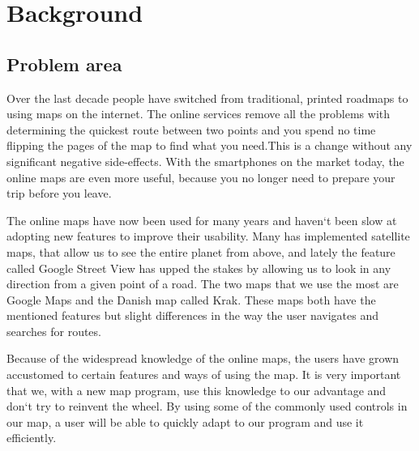 \chapter{Background}
\label{BG}
\section{Problem area}
\label{BG-PR}
Over the last decade people have switched from traditional, printed roadmaps 
to using maps on the internet. The online services remove all the problems with
determining the quickest route between two points and you spend no time flipping
the pages of the map to find what you need.This is a change without any
significant negative side-effects. With the smartphones on the market today, the
online maps are even more useful, because you no longer need to prepare your
trip before you leave.

The online maps have now been used for many years and haven`t been slow 
at adopting new features to improve their usability. Many has 
implemented satellite maps, that allow us to see the entire planet 
from above, and lately the feature called Google Street View has upped 
the stakes by allowing us to look in any direction from a given point 
of a road. The two maps that we use the most are Google Maps and the 
Danish map called Krak. These maps both have the mentioned features 
but slight differences in the way the user navigates and searches 
for routes.

Because of the widespread knowledge of the online maps, the users 
have grown accustomed to certain features and ways of using the map. 
It is very important that we, with a new map program, use this knowledge 
to our advantage and don`t try to reinvent the wheel. By using some 
of the commonly used controls in our map, a user will be able to quickly 
adapt to our program and use it efficiently. 

